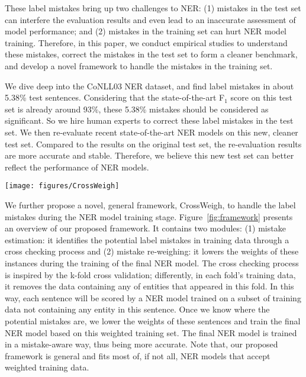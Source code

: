 \documentclass[11pt,a4paper]{article}
\newcommand{\our}{\mbox{\sf CrossWeigh}\xspace}
\begin{document}
These label mistakes bring up two challenges to NER:
(1) mistakes in the test set can interfere the evaluation results and even lead to an inaccurate assessment of model performance;
and (2) mistakes in the training set can hurt NER model training.
Therefore, in this paper, we conduct empirical studies to understand these mistakes, correct the mistakes in the test set to form a cleaner benchmark, and develop a novel framework to handle the mistakes in the training set.

We dive deep into the CoNLL03 NER dataset, and find label mistakes in about 5.38\% test sentences.
Considering that the state-of-the-art F$_1$ score on this test set is already around 93\%, these 5.38\% mistakes should be considered as significant.
So we hire human experts to correct these label mistakes in the test set.
We then re-evaluate recent state-of-the-art NER models on this new, cleaner test set.
Compared to the results on the original test set, the re-evaluation results are more accurate and stable.
Therefore, we believe this new test set can better reflect the performance of NER models.

\begin{figure*}[t]
    \centering
    \texttt{[image: figures/CrossWeigh]}
    \caption{An overview of our proposed \our framework. 
    It can better handle label mistakes, identify low quality annotations and conduct learning from a weighted training set. }
    \label{fig:framework}
\end{figure*}

We further propose a novel, general framework, \our, to handle the label mistakes during the NER model training stage. 
Figure~\ref{fig:framework} presents an overview of our proposed framework.
It contains two modules: (1) mistake estimation: it identifies the potential label mistakes in training data through a cross checking process and (2) mistake re-weighing: it lowers the weights of these instances during the training of the final NER model.
The cross checking process is inspired by the k-fold cross validation; differently, in each fold's training data, it removes the data containing any of entities that appeared in this fold.
In this way, each sentence will be scored by a NER model trained on a subset of training data not containing any entity in this sentence.
Once we know where the potential mistakes are, we lower the weights of these sentences and train the final NER model based on this weighted training set.
The final NER model is trained in a mistake-aware way, thus being more accurate.
Note that, our proposed framework is general and fits most of, if not all, NER models that accept weighted training data.
\end{document}
